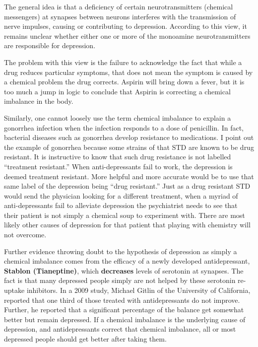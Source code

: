 \documentclass[]{book}
\begin{document}
The general idea is that a deficiency of certain neurotransmitters (chemical messengers) at synapses between neurons interferes with the transmission of nerve impulses, causing or contributing to depression. According to this view, it remains unclear whether either one or more of the monoamine neurotransmitters are responsible for depression.

The problem with this view is the failure to acknowledge the fact that while a drug reduces particular symptoms, that does not mean the symptom is caused by a chemical problem the drug corrects. Aspirin will bring down a fever, but it is too much a jump in logic to conclude that Aspirin is correcting a chemical imbalance in the body.

Similarly, one cannot loosely use the term chemical imbalance to explain a gonorrhea infection when the infection responds to a dose of penicillin. In fact, bacterial diseases such as gonorrhea develop resistance to medications. I point out the example of gonorrhea because some strains of that STD are known to be drug resistant. It is instructive to know that such drug resistance is not labelled ``treatment resistant.'' When anti-depressants fail to work, the depression is deemed treatment resistant. More helpful and more accurate would be to use that same label of the depression being ``drug resistant.'' Just as a drug resistant STD would send the physician looking for a different treatment, when a myriad of anti-depressants fail to alleviate depression the psychiatrist needs to see that their patient is not simply a chemical soup to experiment with. There are most likely other causes of depression for that patient that playing with chemistry will not overcome.

Further evidence throwing doubt to the hypothesis of depression as simply a chemical imbalance comes from the efficacy of a newly developed antidepressant, \textbf{Stablon (Tianeptine)}, which \textbf{decreases} levels of serotonin at synapses. The fact is that many depressed people simply are not helped by these serotonin re-uptake inhibitors. In a 2009 study, Michael Gitlin of the University of California, reported that one third of those treated with antidepressants do not improve. Further, he reported that a significant percentage of the balance get somewhat better but remain depressed. If a chemical imbalance is the underlying cause of depression, and antidepressants correct that chemical imbalance, all or most depressed people should get better after taking them.
\end{document}
